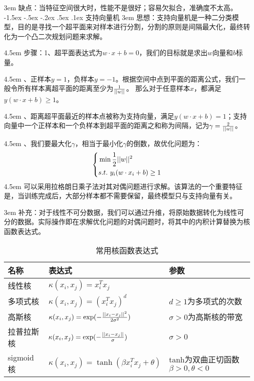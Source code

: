 \documentclass[a4paper, 11pt]{article}
\makeatletter
\newcommand{\sihao}{\fontsize{14pt}{\baselineskip}\selectfont}
\renewcommand\section{\@startsection{section}{1}{\z@}%
{-1.5ex \@plus -.5ex \@minus -.2ex}%
{.5ex \@plus .1ex}%
{\normalfont\sihao\CJKfamily{hei}}}
\makeatother
\begin{document}
\begin{CJK*}{GBK}{song}
\hangindent 3em
缺点：当特征空间很大时，性能不是很好；容易欠拟合，准确度不太高。
\section{支持向量机}
\hangindent 3em
思想：支持向量机是一种二分类模型，目的是寻找一个超平面来对样本进行分割，分割的原则是间隔最大化，最终转化为一个凸二次规划问题来求解。

\hangindent 4.5em
步骤：1、超平面表达式为$w \cdot x + b = 0$，我们的目标就是求出$w$向量和$b$标量。

\hangindent 4.5em
\quad\quad{}、正样本$y=1$，负样本$y=-1$。根据空间中点到平面的距离公式，我们一般令所有样本离超平面的距离至少为${1 \over {||w||}}$。 那么对于任意样本$x$，都满足$y(w \cdot x + b) \ge 1$。

\hangindent 4.5em
\quad\quad{}、距离超平面最近的样本点被称为支持向量，满足$y(w \cdot x + b) = 1$；支持向量中一个正样本和一个负样本到超平面的距离之和称为间隔，记为$\gamma  = {2 \over {||w||}}$。

\hangindent 4.5em
\quad\quad{}、我们要最大化$\gamma$，相当于最小化$\gamma$的倒数，故优化问题为：
$$ \left\{
\begin{aligned}
&\min {1 \over 2}||w|{|^2}\\
&s.t.\ {y_i}(w \cdot {x_i} + b) \ge 1
\end{aligned}
\right.
$$
\hangindent 4.5em
可以采用拉格朗日乘子法对其对偶问题进行求解。该算法的一个重要特征是，当训练完成后，大部分样本都不需要保留，最终模型只与支持向量有关。

\hangindent 3em
补充：对于线性不可分数据，我们可以通过升维，将原始数据转化为线性可分的数据。实际操作即在求解优化问题的对偶问题时，将其中的内积计算替换为核函数表达式。

\begin{table}[htbp]
\centering
\caption{常用核函数表达式}

\begin{tabular}{lll}
\hline
\textbf{名称} & \textbf{表达式}& \textbf{参数}\\
\hline
线性核 & $\kappa ({x_i},{x_j}) = x_i^T{x_j}$ &\\
多项式核&$\kappa ({x_i},{x_j}) = {(x_i^T{x_j})^d}$&$d \ge 1$为多项式的次数\\
高斯核&$\kappa ({x_i},{x_j}) = \exp ( - {{||{x_i} - {x_j}|{|^2}} \over {2{\sigma ^2}}})$&$\sigma  > 0$为高斯核的带宽\\
拉普拉斯核&$\kappa ({x_i},{x_j}) = \exp ( - {{||{x_i} - {x_j}||} \over \sigma })$&$\sigma  > 0$\\
sigmoid核&$\kappa ({x_i},{x_j}) = \tanh (\beta x_i^T{x_j} + \theta )$&tanh为双曲正切函数$\beta  > 0,\theta  < 0$\\
\hline
\end{tabular}


\end{table}
\end{CJK*}
\end{document}
